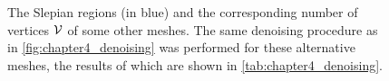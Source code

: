 \begin{figure}[htp]
	\centering
	\hfill
	\hfill
	\newline
	\caption{
		The Slepian regions (in blue) and the corresponding number of vertices \(\mathcal{V}{}\) of some other meshes.
		The same denoising procedure as in \cref{fig:chapter4_denoising} was performed for these alternative meshes, the results of which are shown in \cref{tab:chapter4_denoising}.
	}\label{fig:chapter4_other_meshes}
\end{figure}
